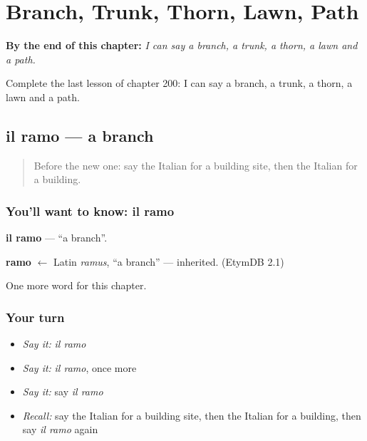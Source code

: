 
\chapter{Branch, Trunk, Thorn, Lawn, Path}
\label{ch:it-branch-trunk-thorn-lawn-path}

\begin{chapteropening}
\textbf{By the end of this chapter:} \emph{I can say a branch, a trunk, a thorn, a lawn and a path.}

Complete the last lesson of chapter 200: I can say a branch, a trunk, a thorn, a lawn and a path.
\end{chapteropening}

\section[il ramo]{il ramo — a branch}

\label{lesson:IT-C200-ramo}



\begin{quote}
Before the new one: say the Italian for a building site, then the Italian for a building.
\end{quote}

\subsection*{You'll want to know: il ramo}
\textbf{il ramo} — \textquotedblleft{}a branch\textquotedblright{}.

\begin{cousinweb}
\textbf{ramo} $\leftarrow$ Latin \emph{ramus}, \textquotedblleft{}a branch\textquotedblright{} — inherited. (EtymDB 2.1)
\end{cousinweb}

\begin{grammarlens}[title={What you've built}]
One more word for this chapter.
\end{grammarlens}

\subsection*{Your turn}
\begin{itemize}
\raggedright
  \item \emph{Say it:} \emph{il ramo}
  \item \emph{Say it:} \emph{il ramo}, once more
  \item \emph{Say it:} say \emph{il ramo}
  \item \emph{Recall:} say the Italian for a building site, then the Italian for a building, then say \emph{il ramo} again
\end{itemize}

